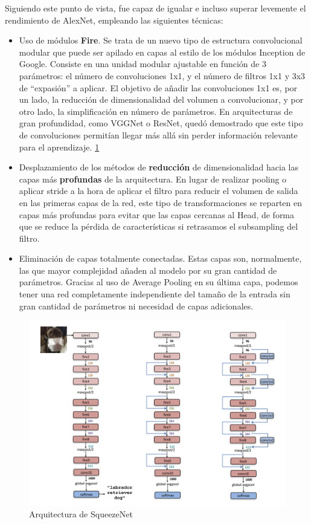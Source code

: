 Siguiendo este punto de vista, fue capaz de igualar e incluso superar levemente el rendimiento de AlexNet\cite{NIPS2012_c399862d}, empleando las siguientes técnicas:
\begin{itemize}
    \item Uso de módulos \textbf{Fire}. Se trata de un nuevo tipo de estructura convolucional modular que puede ser apilado en capas al estilo de los módulos Inception \cite{szegedy2014going} de Google. Consiste en una unidad modular ajustable en función de 3 parámetros: el número de convoluciones 1x1, y el número de filtros 1x1 y 3x3 de ``expasión'' a aplicar. El objetivo de añadir las convoluciones 1x1 es, por un lado, la reducción de dimensionalidad del volumen a convolucionar, y por otro lado, la simplificación en número de parámetros. En arquitecturas de gran profundidad, como VGGNet o ResNet, quedó demostrado que este tipo de convoluciones permitían llegar más allá sin perder información relevante para el aprendizaje. \ref{figsqueeze}
    \item Desplazamiento de los métodos de \textbf{reducción} de dimensionalidad hacia las capas más \textbf{profundas} de la arquitectura. En lugar de realizar pooling o aplicar stride a la hora de aplicar el filtro para reducir el volumen de salida en las primeras capas de la red, este tipo de transformaciones se reparten en capas más profundas para evitar que las capas cercanas al Head, de forma que se reduce la pérdida de características si retrasamos el subsampling del filtro.
    \item Eliminación de capas totalmente conectadas. Estas capas son, normalmente, las que mayor complejidad añaden al modelo por su gran cantidad de parámetros. Gracias al uso de Average Pooling en su última capa, podemos tener una red completamente independiente del tamaño de la entrada sin gran cantidad de parámetros ni necesidad de capas adicionales.
\end{itemize}

\begin{figure}[H]
	\label{figsqueeze}
	\centering
	\includegraphics[scale = 0.2]{imagenes/squeezenet.png}
	\caption{Arquitectura de SqueezeNet}
\end{figure}


